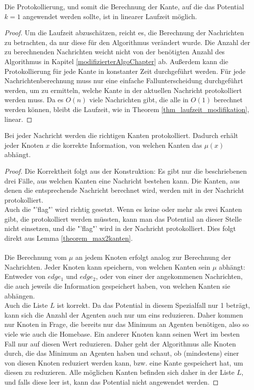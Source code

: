 	\begin{theorem}
		Die Protokollierung, und somit die Berechnung der Kante, auf die das Potential $k=1$ angewendet werden sollte, ist in linearer Laufzeit möglich.
	\end{theorem}
	\begin{proof}
		Um die Laufzeit abzuschätzen, reicht es, die Berechnung der Nachrichten zu betrachten, da nur diese für den Algorithmus verändert wurde. Die Anzahl der zu berechnenden Nachrichten weicht nicht von der benötigten Anzahl des Algorithmus in Kapitel \ref{modifizierterAlgoChapter} ab. Außerdem kann die Protokollierung für jede Kante in konstanter Zeit durchgeführt werden. Für jede Nachrichtenberechnung muss nur eine einfache Fallunterscheidung durchgeführt werden, um zu ermitteln, welche Kante in der aktuellen Nachricht protokolliert werden muss. Da es $O(n)$ viele Nachrichten gibt, die alle in $O(1)$ berechnet werden können, bleibt die Laufzeit, wie in Theorem \ref{thm_laufzeit_modifikation}, linear.
	\end{proof}
	
	\begin{theorem}
		Bei jeder Nachricht werden die richtigen Kanten protokolliert. Dadurch erhält jeder Knoten $x$ die korrekte Information, von welchen Kanten das $\mu(x)$ abhängt. 
	\end{theorem}
	\begin{proof}
		Die Korrektheit folgt aus der Konstruktion: Es gibt nur die beschriebenen drei Fälle, aus welchen Kanten eine Nachricht bestehen kann. Die Kanten, aus denen die entsprechende Nachricht berechnet wird, werden mit in der Nachricht protokolliert.\\
		Auch die "'flag"' wird richtig gesetzt. Wenn es keine oder mehr als zwei Kanten gibt, die protokolliert werden müssten, kann man das Potential an dieser Stelle nicht einsetzen, und die "'flag"' wird in der Nachricht protokolliert. Dies folgt direkt aus Lemma \ref{theorem_max2kanten}.
		\\
		\\
		Die Berechnung vom $\mu$ an jedem Knoten erfolgt analog zur Berechnung der Nachrichten. Jeder Knoten kann speichern, von welchen Kanten sein $\mu$ abhängt: Entweder von $edge_{1}$ und $edge_{2}$, oder von einer der angekommenen Nachrichten, die auch jeweils die Information gespeichert haben, von welchen Kanten sie abhängen.\\
		Auch die Liste $L$ ist korrekt. Da das Potential in diesem Spezialfall nur 1 beträgt, kann sich die Anzahl der Agenten auch nur um eins reduzieren. Daher kommen nur Knoten in Frage, die bereits nur das Minimum an Agenten benötigen, also so viele wie auch die Homebase. Ein anderer Knoten kann seinen Wert im besten Fall nur auf diesen Wert reduzieren. Daher geht der Algorithmus alle Knoten durch, die das Minimum an Agenten haben und schaut, ob (mindestens) einer von diesen Knoten reduziert werden kann, bzw. eine Kante gespeichert hat, um diesen zu reduzieren. Alle möglichen Kanten befinden sich daher in der Liste $L$, und falls diese leer ist, kann das Potential nicht angewendet werden.
		
	\end{proof}


